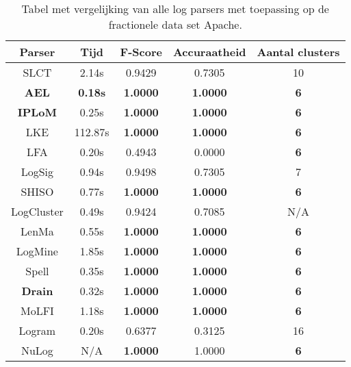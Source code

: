 \begin{table}[!hbtp]
    \caption{Tabel met vergelijking van alle log parsers met toepassing op de fractionele data set Apache.}
    \label{table:Apache}
    \begin{center}
        \begin{tabular}{||c | c | c | c | c||} 
            \hline
            Parser & Tijd & F-Score & Accuraatheid & Aantal clusters \\ [0.5ex] 
            \hline\hline
            SLCT & 2.14s & 0.9429 & 0.7305 & 10 \\
            
            \textbf{AEL} & \textbf{0.18s} & \textbf{1.0000} & \textbf{1.0000} & \textbf{6} \\ 
            
            \textbf{IPLoM} & 0.25s & \textbf{1.0000} & \textbf{1.0000} & \textbf{6}  \\
            
            LKE & 112.87s & \textbf{1.0000} & \textbf{1.0000} & \textbf{6}  \\
            
            LFA & 0.20s & 0.4943 & 0.0000 & \textbf{6}  \\
            
            LogSig & 0.94s & 0.9498 & 0.7305 & 7 \\
            
            SHISO & 0.77s & \textbf{1.0000} & \textbf{1.0000} & \textbf{6}  \\
            
            LogCluster & 0.49s & 0.9424 & 0.7085 & N/A \\
            
            LenMa & 0.55s & \textbf{1.0000} & \textbf{1.0000} & \textbf{6}  \\
            
            LogMine & 1.85s & \textbf{1.0000} & \textbf{1.0000} & \textbf{6} \\
            
            Spell & 0.35s & \textbf{1.0000} & \textbf{1.0000} & \textbf{6}  \\
            
            \textbf{Drain} & 0.32s & \textbf{1.0000} & \textbf{1.0000} & \textbf{6} \\
            
            MoLFI & 1.18s & \textbf{1.0000} & \textbf{1.0000} & \textbf{6} \\
            
            Logram & 0.20s & 0.6377 & 0.3125 & 16 \\
            
            NuLog & N/A & \textbf{1.0000} & 1.0000 & \textbf{6} \\
            \hline
        \end{tabular}
    \end{center}
\end{table}


